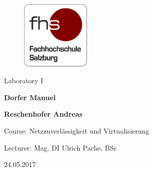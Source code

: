 
\begin{titlepage}

\hspace{7cm}

\begin{figure}[!ht]
	\centering
	\includegraphics[width=0.3\textwidth]{fhs_logo_web.png}
\end{figure}

\begin{center}
	\vspace{2cm}
	\Huge Laboratory I
	\vspace{3cm}
	
	\Large{\bf\large Dorfer Manuel}	
	
	\Large{\bf\large Reschenhofer Andreas}
	\vspace{3cm}

	\large Course: Netzzuverlässigkeit und Virtualisierung 
	
	\large Lecturer: Mag. DI Ulrich Pache, BSc 
	
	\large 24.05.2017
\end{center}

\end{titlepage}